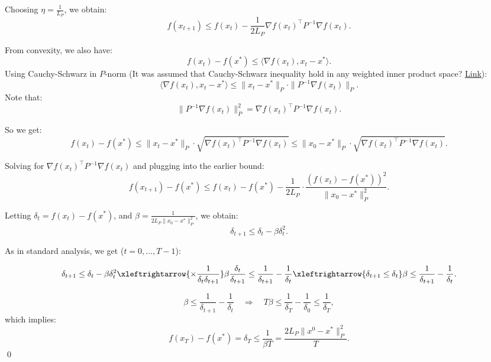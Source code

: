 \documentclass{article}
\begin{document}
Choosing \( \eta = \frac{1}{L_P} \), we obtain:
\[
f(x_{t+1}) \le f(x_t) - \frac{1}{2 L_P} \nabla f(x_t)^\top P^{-1} \nabla f(x_t).
\]

From convexity, we also have:
\[
f(x_t) - f(x^*) \le \langle \nabla f(x_t), x_t - x^* \rangle.
\]
Using Cauchy-Schwarz in \(P\)-norm (It was assumed that Cauchy-Schwarz inequality hold in any weighted inner product space? \href{https://math.stackexchange.com/questions/463073/why-does-the-cauchy-schwarz-inequality-hold-in-any-inner-product-space}{Link}):
\[
\langle \nabla f(x_t), x_t - x^* \rangle \le \|x_t - x^*\|_P \cdot \|P^{-1} \nabla f(x_t)\|_P.
\]
Note that:
\[
\|P^{-1} \nabla f(x_t)\|_P^2 = \nabla f(x_t)^\top P^{-1} \nabla f(x_t).
\]

So we get:
\[
f(x_t) - f(x^*) \le \|x_t - x^*\|_P \cdot \sqrt{\nabla f(x_t)^\top P^{-1} \nabla f(x_t)} \le \|x_0 - x^*\|_P \cdot \sqrt{\nabla f(x_t)^\top P^{-1} \nabla f(x_t)}.
\]

Solving for \( \nabla f(x_t)^\top P^{-1} \nabla f(x_t) \) and plugging into the earlier bound:
\[
f(x_{t+1}) - f(x^*) \le f(x_t) - f(x^*) - \frac{1}{2 L_P} \cdot \frac{(f(x_t) - f(x^*))^2}{\|x_0 - x^*\|_P^2}.
\]

Letting \( \delta_t = f(x_t) - f(x^*) \), and \( \beta = \frac{1}{2 L_P \|x_0 - x^*\|_P^2} \), we obtain:
\[
\delta_{t+1} \le \delta_t - \beta \delta_t^2.
\]

As in standard analysis, we get ($t = 0, \dots, T - 1$):

\[
\delta_{t+1} \leq \delta_t - \beta \delta_t^2 \xleftrightarrow{\times \frac{1}{\delta_t \delta_{t+1}}}
\beta \frac{\delta_t}{\delta_{t+1}} \leq \frac{1}{\delta_{t+1}} - \frac{1}{\delta_t}
\xleftrightarrow{\delta_{t+1} \leq \delta_t}
\beta \leq \frac{1}{\delta_{t+1}} - \frac{1}{\delta_t}.
\]

\[
\beta \le \frac{1}{\delta_{t+1}} - \frac{1}{\delta_t} \quad \Rightarrow \quad T \beta \le \frac{1}{\delta_T} - \frac{1}{\delta_0} \le \frac{1}{\delta_T},
\]
which implies:
\[
f(x_T) - f(x^*) = \delta_T \le \frac{1}{\beta T} = \frac{2 L_P \|x^0 - x^*\|_P^2}{T}.
\]
\qed
\end{document}

